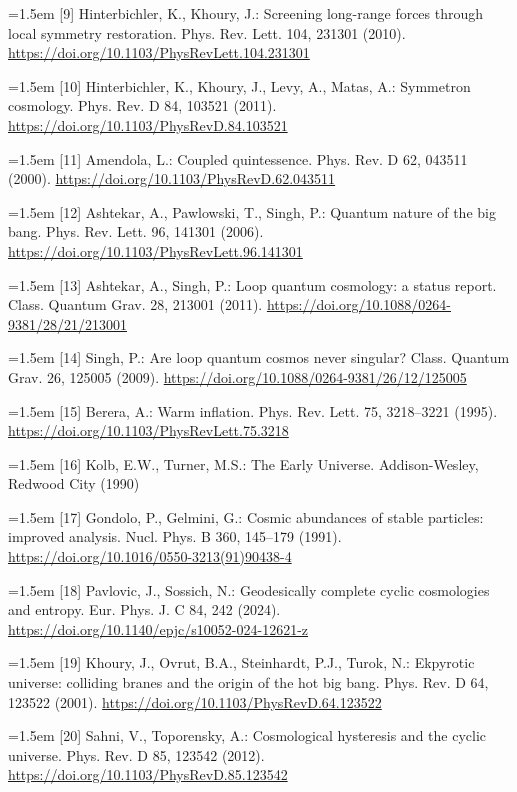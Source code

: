 \documentclass[11pt,a4paper]{article}
\begin{document}
\noindent\hangindent=1.5em [9] Hinterbichler, K., Khoury, J.: Screening long-range forces through local symmetry restoration. Phys. Rev. Lett. 104, 231301 (2010). \url{https://doi.org/10.1103/PhysRevLett.104.231301}\par
\noindent\hangindent=1.5em [10] Hinterbichler, K., Khoury, J., Levy, A., Matas, A.: Symmetron cosmology. Phys. Rev. D 84, 103521 (2011). \url{https://doi.org/10.1103/PhysRevD.84.103521}\par
\noindent\hangindent=1.5em [11] Amendola, L.: Coupled quintessence. Phys. Rev. D 62, 043511 (2000). \url{https://doi.org/10.1103/PhysRevD.62.043511}\par
\noindent\hangindent=1.5em [12] Ashtekar, A., Pawlowski, T., Singh, P.: Quantum nature of the big bang. Phys. Rev. Lett. 96, 141301 (2006). \url{https://doi.org/10.1103/PhysRevLett.96.141301}\par
\noindent\hangindent=1.5em [13] Ashtekar, A., Singh, P.: Loop quantum cosmology: a status report. Class. Quantum Grav. 28, 213001 (2011). \url{https://doi.org/10.1088/0264-9381/28/21/213001}\par
\noindent\hangindent=1.5em [14] Singh, P.: Are loop quantum cosmos never singular? Class. Quantum Grav. 26, 125005 (2009). \url{https://doi.org/10.1088/0264-9381/26/12/125005}\par
\noindent\hangindent=1.5em [15] Berera, A.: Warm inflation. Phys. Rev. Lett. 75, 3218--3221 (1995). \url{https://doi.org/10.1103/PhysRevLett.75.3218}\par
\noindent\hangindent=1.5em [16] Kolb, E.W., Turner, M.S.: The Early Universe. Addison-Wesley, Redwood City (1990)\par
\noindent\hangindent=1.5em [17] Gondolo, P., Gelmini, G.: Cosmic abundances of stable particles: improved analysis. Nucl. Phys. B 360, 145--179 (1991). \url{https://doi.org/10.1016/0550-3213(91)90438-4}\par
\noindent\hangindent=1.5em [18] Pavlovic, J., Sossich, N.: Geodesically complete cyclic cosmologies and entropy. Eur. Phys. J. C 84, 242 (2024). \url{https://doi.org/10.1140/epjc/s10052-024-12621-z}\par
\noindent\hangindent=1.5em [19] Khoury, J., Ovrut, B.A., Steinhardt, P.J., Turok, N.: Ekpyrotic universe: colliding branes and the origin of the hot big bang. Phys. Rev. D 64, 123522 (2001). \url{https://doi.org/10.1103/PhysRevD.64.123522}\par
\noindent\hangindent=1.5em [20] Sahni, V., Toporensky, A.: Cosmological hysteresis and the cyclic universe. Phys. Rev. D 85, 123542 (2012). \url{https://doi.org/10.1103/PhysRevD.85.123542}\par
\end{document}
